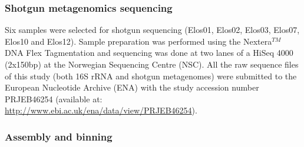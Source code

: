 \subsubsection*{Shotgun metagenomics sequencing}

   Six samples were selected for shotgun sequencing (Elos01, Elos02, Elos03, Elos07, Elos10 and Elos12). 
   Sample preparation was performed using the Nextera$^{TM}$ DNA Flex Tagmentation and sequencing was done at two lanes of a HiSeq 4000 (2x150bp) at the Norwegian Sequencing Centre (NSC). 
   All the raw sequence files of this study (both 16S rRNA and shotgun metagenomes) were submitted to the European Nucleotide Archive (ENA) \citep{cummins_european_2022} with the study accession number PRJEB46254 
   (available at: \\ \href{http://www.ebi.ac.uk/ena/data/view/PRJEB46254}{http://www.ebi.ac.uk/ena/data/view/PRJEB46254}).


\subsubsection*{Assembly and binning}

